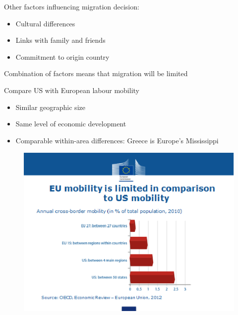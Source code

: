 \documentclass{beamer}
\begin{document}
\begin{frame}
  Other factors influencing migration decision:
  \begin{itemize}
    \item Cultural differences
    \item Links with family and friends
    \item Commitment to origin country
  \end{itemize}
  \medskip
  Combination of factors means that migration will be limited
\end{frame}

\begin{frame} 
  Compare US with European labour mobility  
  \begin{itemize}
    \item Similar geographic size
    \item Same level of economic development
    \item Comparable within-area differences: Greece is Europe's Mississippi
  \end{itemize}
\end{frame}

\begin{frame}
  \begin{figure}
    \includegraphics[scale=.7]{eu_labour.eps}
  \end{figure}
\end{frame}
\end{document}
